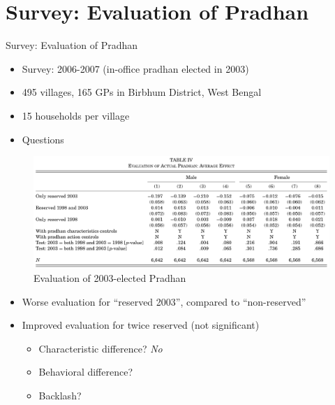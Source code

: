\documentclass[
  10pt,
  ignorenonframetext,
  aspectratio=43,
]{beamer}
\providecommand{\tightlist}{%
  \setlength{\itemsep}{0pt}\setlength{\parskip}{0pt}}
\begin{document}
\hypertarget{survey-evaluation-of-pradhan}{%
\section{Survey: Evaluation of
Pradhan}\label{survey-evaluation-of-pradhan}}

\begin{frame}{Survey: Evaluation of Pradhan}
\begin{itemize}
\tightlist
\item
  Survey: 2006-2007 (in-office pradhan elected in 2003)
\item
  495 villages, 165 GPs in Birbhum District, West Bengal
\item
  15 households per village
\item
  Questions

\end{itemize}
\end{frame}

\begin{frame}
\begin{figure}
\centering
\includegraphics{20220523-qje-beaman-duflo-powerful-women.assets/table4-evaluation of pradhan.png}
\caption{Evaluation of 2003-elected Pradhan}
\end{figure}

\begin{itemize}
\tightlist
\item
  Worse evaluation for ``reserved 2003'', compared to ``non-reserved''
\item
  Improved evaluation for twice reserved (not significant)

  \begin{itemize}
  \tightlist
  \item
    Characteristic difference? \emph{No}
  \item
    Behavioral difference?
  \item
    Backlash?
  \end{itemize}
\end{itemize}
\end{frame}
\end{document}
